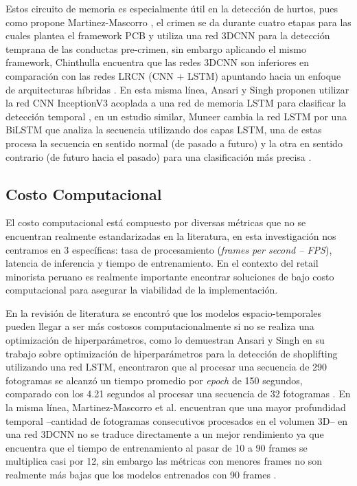 Estos circuito de memoria es especialmente útil en la detección de hurtos, pues como propone Martinez-Mascorro \cite{martinez-mascorro_suspicious_2021}, el crimen
se da durante cuatro etapas para las cuales plantea el framework PCB y utiliza una red 3DCNN para la detección temprana de las conductas pre-crimen, sin embargo
aplicando el mismo framework, Chinthulla encuentra que las redes 3DCNN son inferiores en comparación con las redes LRCN (CNN + LSTM) apuntando
hacia un enfoque de arquitecturas híbridas \cite{chinthulla_deep_2025}. En esta misma línea, Ansari y Singh proponen utilizar la red CNN InceptionV3 acoplada a una
red de memoria LSTM para clasificar la detección temporal \cite{ansari_optimized_2023}, en un estudio similar, Muneer cambia la red LSTM por una BiLSTM que analiza la secuencia
utilizando dos capas LSTM, una de estas procesa la secuencia en sentido normal (de pasado a futuro) y la otra en sentido contrario (de futuro hacia el pasado) para
una clasificación más precisa \cite{muneer_shoplifting_2023}.

\subsection{Costo Computacional}

  El costo computacional está compuesto por diversas métricas que no se encuentran realmente
  estandarizadas en la literatura, en esta investigación nos centramos en 3 específicas: tasa
  de procesamiento (\textit{frames per second -- FPS}), latencia de inferencia y tiempo de
  entrenamiento. En el contexto del retail minorista peruano es realmente importante
  encontrar soluciones de bajo costo computacional para asegurar la viabilidad de la
  implementación. 
  
  En la revisión de literatura se encontró que los modelos espacio-temporales
  pueden llegar a ser más costosos computacionalmente si no se realiza una optimización de
  hiperparámetros, como lo demuestran Ansari y Singh
  en su trabajo sobre optimización de hiperparámetros para la detección de shoplifting
  utilizando una red LSTM, encontraron que al procesar una secuencia de 290
  fotogramas se alcanzó un tiempo promedio por \textit{epoch} de 150 segundos,
  comparado con los 4.21 segundos al procesar una secuencia de 32 fotogramas
  \cite{ansari_optimized_2023}. En la misma línea, Martinez-Mascorro et al. encuentran que una
  mayor profundidad temporal --cantidad de fotogramas consecutivos procesados en el volumen 3D--
  en una red 3DCNN no se traduce directamente a un mejor rendimiento ya que encuentra que el
  tiempo de entrenamiento al pasar de 10 a 90 frames se multiplica casi por 12, sin embargo
  las métricas con menores frames no son realmente más bajas que los modelos entrenados con
  90 frames \cite{martinez-mascorro_suspicious_2021}.


